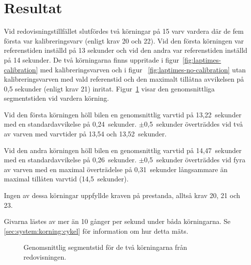 \section{Resultat}

Vid redovisningstillfället slutfördes två körningar på 15 varv vardera där de
fem första var kalibreringsvarv (enligt krav 20 och 22). Vid den första
körningen var referenstiden inställd på 13 sekunder och vid den andra var
referenstiden inställd på 14 sekunder. De två körningarna finns uppritade i
figur~\ref{fig:laptimes-calibration} med kalibreringsvarven och i figur~
\ref{fig:laptimes-no-calibration} utan kalibreringsvarven med vald referenstid
och den maximalt tillåtna avvikelsen på 0,5 sekunder (enligt krav 21) inritat.
Figur~\ref{fig:segtimes} visar den genomsnittliga segmentstiden vid vardera
körning.

Vid den första körningen höll bilen en genomsnittlig varvtid på 13,22~sekunder
med en standardavvikelse på 0,24~sekunder. $\pm$0,5~sekunder överträddes vid två
av varven med varvtider på 13,54 och 13,52~sekunder.

Vid den andra körningen höll bilen en genomsnittlig varvtid på 14,47~sekunder
med en standardavvikelse på 0,26~sekunder. $\pm$0,5~sekunder överträddes vid
fyra av varven med en maximal överträdelse på 0,31~sekunder långsammare än
maximal tillåten varvtid (14,5~sekunder).

Ingen av dessa körningar uppfyllde kraven på prestanda, alltså krav 20, 21 och
23.

Givarna lästes av mer än 10 gånger per sekund under båda körningarna. Se
\ref{sec:system:korning:cykel} för information om hur detta mäts.

\begin{figure}
	\centering
	\caption{Genomsnittlig segmentstid för de två körningarna från redovisningen.}
	\label{fig:segtimes}
\end{figure}

